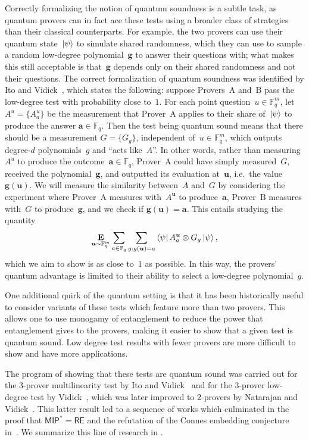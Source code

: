 \documentclass[11pt]{article}
\theoremstyle{definition}
\newcommand{\E}{\mathop{\bf E\/}}
\newcommand{\F}{\mathbb F}
\newcommand{\ot}{\otimes}
\newcommand{\ba}{\boldsymbol{a}}
\newcommand{\bg}{\boldsymbol{g}}
\newcommand{\bu}{\boldsymbol{u}}
\begin{document}
Correctly formalizing the notion of quantum soundness is a subtle task,
as quantum provers can in fact ace these tests
using a broader class of strategies than their classical counterparts.
For example, the two provers can use their quantum state~$\ket{\psi}$ to simulate shared randomness,
which they can use to sample a random low-degree polynomial~$\bg$  to answer their questions with;
what makes this still acceptable is that~$\bg$ depends only on their shared randomness and not their questions.
The correct formalization of quantum soundness was identified by Ito and Vidick~\cite{IV12},
which states the following:
suppose Provers~$\mathrm{A}$ and~$\mathrm{B}$ pass the low-degree test with probability close to~$1$.
For each point question~$u \in \F_q^m$,
let $A^{u} = \{A^{u}_a\}$ be the measurement that Prover~$\mathrm{A}$ applies to
their share of~$\ket{\psi}$ to produce the answer $\ba \in \F_q$.
Then the test being quantum sound
means that there should be a measurement $G = \{G_g\}$, independent of~$u \in \F_q^m$,
which outputs degree-$d$ polynomials~$g$
and ``acts like~$A$''.
In other words, rather than measuring~$A^{u}$ to produce the outcome~$\ba \in \F_q$,
Prover~$\mathrm{A}$ could have simply measured~$G$, received the polynomial~$\bg$,
and outputted its evaluation at~$\bu$, i.e.\ the value $\bg(\bu)$.
We will measure the similarity between~$A$ and~$G$
by considering the experiment where Prover~$\mathrm{A}$ measures with~$A^{\bu}$ to produce~$\ba$,
Prover~$\mathrm{B}$ measures with~$G$ to produce~$\bg$, and we check if $\bg(\bu) = \ba$.
This entails studying the quantity
\begin{equation*}
\E_{\bu \sim \F_q^m} \sum_{a \in \F_q} \sum_{g:g(\bu) = a}\bra{\psi} A^{\bu}_a \ot G_g \ket{\psi},
\end{equation*}
which we aim to show is as close to~$1$ as possible.
In this way, the provers' quantum advantage is limited to their ability to select a low-degree polynomial~$g$.

One additional quirk of the quantum setting
is that it has been historically useful to consider variants of these tests which feature more than two provers.
This allows one to use monogamy of entanglement to reduce the power that entanglement gives to the provers,
making it easier to show that a given test is quantum sound.
Low degree test results with fewer provers are more difficult to show and have more applications.

The program of showing that these tests are quantum sound was carried out for the $3$-prover multilinearity test by Ito and Vidick~\cite{IV12}
and for the $3$-prover low-degree test by Vidick~\cite{Vid16},
which was later improved to $2$-provers by Natarajan and Vidick~\cite{NV18b}.
This latter result led to a sequence of works
which culminated in the proof that $\mathsf{MIP}^* = \mathsf{RE}$
and the refutation of the Connes embedding conjecture in~\cite{JNV+20}.
We summarize this line of research in .
\end{document}
